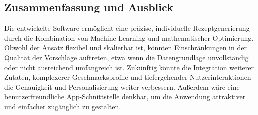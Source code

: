 \documentclass[a4paper,12pt]{article}
\begin{document}
\subsection{Zusammenfassung und Ausblick}
Die entwickelte Software ermöglicht eine präzise, individuelle Rezeptgenerierung durch die Kombination von Machine Learning und mathematischer Optimierung. Obwohl der Ansatz flexibel und skalierbar ist, könnten Einschränkungen in der Qualität der Vorschläge auftreten, etwa wenn die Datengrundlage unvollständig oder nicht ausreichend umfangreich ist. Zukünftig könnte die Integration weiterer Zutaten, komplexerer Geschmacksprofile und tiefergehender Nutzerinteraktionen die Genauigkeit und Personalisierung weiter verbessern. Außerdem wäre eine benutzerfreundliche App-Schnittstelle denkbar, um die Anwendung attraktiver und einfacher zugänglich zu gestalten.
\end{document}
